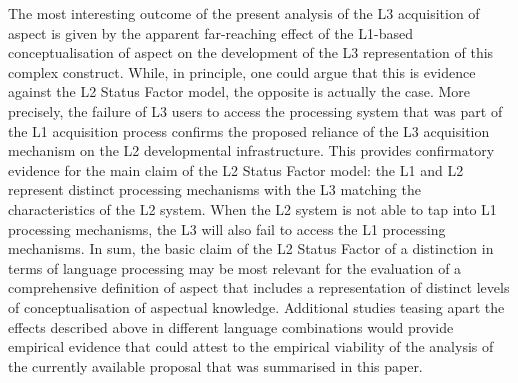 \documentclass[output=paper,modfonts,nonflat,newtxmath]{langsci/langscibook}
\begin{document}
The most interesting outcome of the present analysis of the L3 acquisition of aspect is given by the apparent far-reaching effect of the L1-based conceptualisation of aspect on the development of the L3 representation of this complex construct. While, in principle, one could argue that this is evidence against the L2 Status Factor model, the opposite is actually the case. More precisely, the failure of L3 users to access the processing system that was part of the L1 acquisition process confirms the proposed reliance of the L3 acquisition mechanism on the L2 developmental infrastructure.  This provides confirmatory evidence for the main claim of the L2 Status Factor model: the L1 and L2 represent distinct processing mechanisms with the L3 matching the characteristics of the L2 system. When the L2 system is not able to tap into L1 processing mechanisms, the L3 will also fail to access the L1 processing mechanisms. In sum, the basic claim of the L2 Status Factor of a distinction in terms of language processing may be most relevant for the evaluation of a comprehensive definition of aspect that includes a representation of distinct levels of conceptualisation of aspectual knowledge. Additional studies teasing apart the effects described above in different language combinations would provide empirical evidence that could attest to the empirical viability of the analysis of the currently available proposal that was summarised in this paper.

\sloppy\printbibliography[heading=subbibliography,notkeyword=this]
\end{document}
